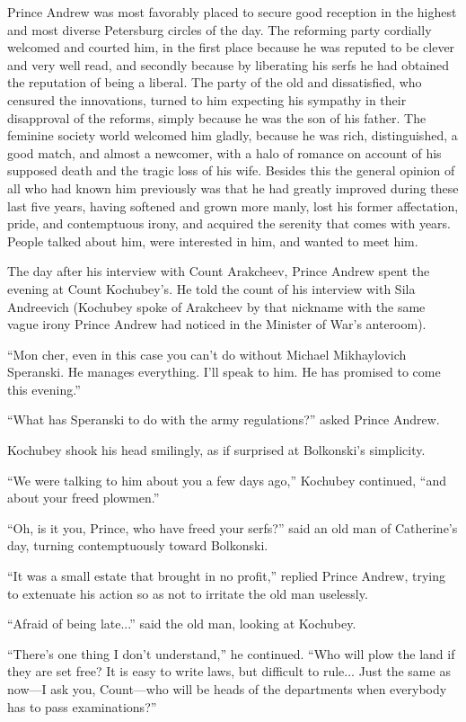 Prince Andrew was most favorably placed to secure good reception
in the highest and most diverse Petersburg circles of the
day. The reforming party cordially welcomed and courted him, in
the first place because he was reputed to be clever and very well
read, and secondly because by liberating his serfs he had
obtained the reputation of being a liberal.  The party of the old
and dissatisfied, who censured the innovations, turned to him
expecting his sympathy in their disapproval of the reforms,
simply because he was the son of his father. The feminine society
world welcomed him gladly, because he was rich, distinguished, a
good match, and almost a newcomer, with a halo of romance on
account of his supposed death and the tragic loss of his
wife. Besides this the general opinion of all who had known him
previously was that he had greatly improved during these last
five years, having softened and grown more manly, lost his former
affectation, pride, and contemptuous irony, and acquired the
serenity that comes with years. People talked about him, were
interested in him, and wanted to meet him.

The day after his interview with Count Arakcheev, Prince Andrew
spent the evening at Count Kochubey's. He told the count of his
interview with Sila Andreevich (Kochubey spoke of Arakcheev by
that nickname with the same vague irony Prince Andrew had noticed
in the Minister of War's anteroom).

``Mon cher, even in this case you can't do without Michael
Mikhay\-lo\-vich Speranski. He manages everything. I'll speak to
him. He has promised to come this evening.''

``What has Speranski to do with the army regulations?'' asked
Prince Andrew.

Kochubey shook his head smilingly, as if surprised at Bolkonski's
simplicity.

``We were talking to him about you a few days ago,'' Kochubey
continued, ``and about your freed plowmen.''

``Oh, is it you, Prince, who have freed your serfs?'' said an old
man of Catherine's day, turning contemptuously toward Bolkonski.

``It was a small estate that brought in no profit,'' replied
Prince Andrew, trying to extenuate his action so as not to
irritate the old man uselessly.

``Afraid of being late...'' said the old man, looking at
Kochubey.

``There's one thing I don't understand,'' he continued. ``Who
will plow the land if they are set free? It is easy to write
laws, but difficult to rule... Just the same as now---I ask you,
Count---who will be heads of the departments when everybody has
to pass examinations?''

